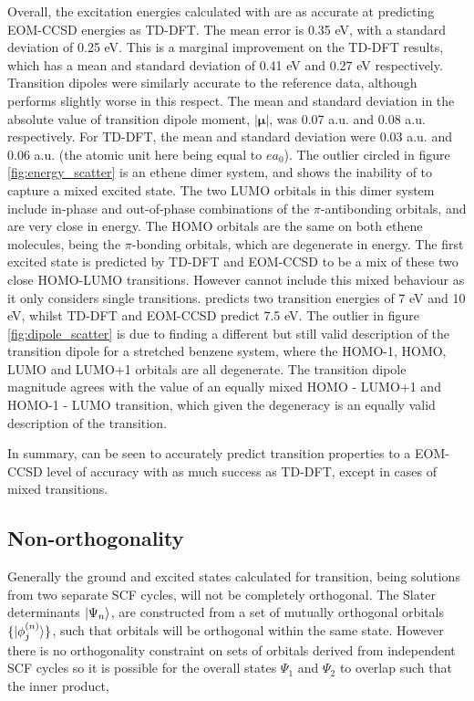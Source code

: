 Overall, the excitation energies calculated with \dscf are as accurate at predicting
EOM-CCSD energies as TD-DFT. The mean error is 0.35 eV, with a standard deviation
of 0.25 eV. This is a marginal improvement on the TD-DFT results, which has a mean
and standard deviation of 0.41 eV and 0.27 eV respectively. Transition dipoles 
were similarly accurate to the reference data, although \dscf performs slightly 
worse in this respect. The mean and standard deviation in the absolute value
of transition dipole moment, $|\mathbf{\mu}|$, was 0.07 a.u. and 0.08 a.u. respectively.
For TD-DFT, the mean and standard deviation were 0.03 a.u. and 0.06 a.u. (the atomic
unit here being equal to $ea_0$).
The outlier circled in figure \ref{fig:energy_scatter} is an ethene dimer system,
and shows the inability of \dscf to capture a mixed excited state. The two LUMO
orbitals in this dimer system include in-phase and out-of-phase combinations of the 
$\pi$-antibonding orbitals, and are very close in energy. The HOMO orbitals are
the same on both ethene molecules, being the $\pi$-bonding orbitals, which are
degenerate in energy. The first excited state is predicted by TD-DFT and EOM-CCSD
to be a mix of these two close HOMO-LUMO transitions. However \dscf cannot include
this mixed behaviour as it only considers single transitions. \dscf predicts two
transition energies of 7 eV and 10 eV, whilst TD-DFT and EOM-CCSD predict 7.5 eV.
The outlier in figure \ref{fig:dipole_scatter} is due to \dscf finding a different
but still valid description of the transition dipole for a stretched benzene system,
where the HOMO-1, HOMO, LUMO and LUMO+1 orbitals are all degenerate. The \dscf transition
dipole magnitude agrees with the value of an equally mixed HOMO - LUMO+1 and HOMO-1 
- LUMO transition, which given the degeneracy is an equally valid description of 
the transition.

In summary, \dscf can be seen to accurately predict transition properties
to a EOM-CCSD level of accuracy with as much success as TD-DFT, except in cases
of mixed transitions. 

\subsection{Non-orthogonality}
\label{subsec:dscf_nonorth}
Generally the ground and excited states calculated for \dscf transition, being solutions
from two separate SCF cycles, will not be completely orthogonal. The Slater determinants
$\ket{\Psi_n}$, are constructed from a set of mutually orthogonal orbitals $\{ \ket{\phi_j^{\left(n\right)}} \}$,
such that orbitals will be orthogonal within the same state. However there is no 
orthogonality constraint on sets of orbitals derived from independent SCF cycles
so it is possible for the overall states $\Psi_1$ and $\Psi_2$ to overlap such 
that the inner product,

